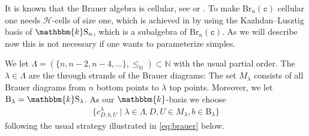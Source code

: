 \documentclass[a4paper,11pt]{amsart}
\renewcommand{\dots}{\text{...}}
\newcommand{\setstuff}[1]{\mathrm{#1}}
\newcommand{\KK}{\mathbbm{k}}
\newcommand{\N}{\mathbb{N}}
\newcommand{\varsym}[1]{\mathtt{#1}}
\newcommand{\cvar}{\varsym{c}}
\numberwithin{equation}{section}
\begin{document}
It is known that the Brauer algebra is cellular, see 
\cite[Section 4]{GrLe-cellular} or \cite[Section 5]{AnStTu-cellular-tilting}. 
To make $\setstuff{Br}_{n}(\cvar)$ cellular one needs 
$\mathcal{H}$-cells of size one, which is achieved in 
\cite[Section 4]{GrLe-cellular} by using the Kazhdan--Lusztig 
basis of $\KK\setstuff{S}_{n}$, which is 
a subalgebra of $\setstuff{Br}_{n}(\cvar)$.
As we will describe now this is not necessary if one wants 
to parameterize simples.

We let $\Lambda=(\{n,n-2,n-4,\dots\},\leq_{\N})\subset\N$ 
with the usual partial order.
The $\lambda\in\Lambda$ are the through strands of the Brauer diagrams:
The set $M_{\lambda}$ consists of all Brauer diagrams 
from $n$ bottom points to $\lambda$ top points.
Moreover, we let $\setstuff{B}_{\lambda}=\KK\setstuff{S}_{\lambda}$.
As our $\KK$-basis we choose 
\begin{gather*}
\{c_{D,b,U}^{\lambda}\mid\lambda\in\Lambda,D,U\in M_{\lambda},
b\in\setstuff{B}_{\lambda}\}
\end{gather*}
following the usual strategy illustrated in \eqref{eq:brauer} below. 
\end{document}
